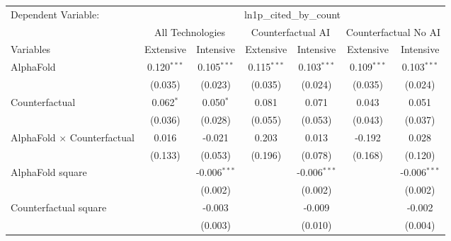 \begingroup
\centering
\begin{tabular}{lcccccc}
   \tabularnewline \midrule \midrule
   Dependent Variable: & \multicolumn{6}{c}{ln1p\_cited\_by\_count}\\
 & \multicolumn{2}{c}{All Technologies} & \multicolumn{2}{c}{Counterfactual AI} & \multicolumn{2}{c}{Counterfactual No AI} \\
\cmidrule(lr){1-1}\cmidrule(lr){2-3} \cmidrule(lr){4-5} \cmidrule(lr){6-7}
Variables & \multicolumn{1}{c}{Extensive} & \multicolumn{1}{c}{Intensive} & \multicolumn{1}{c}{Extensive} & \multicolumn{1}{c}{Intensive} & \multicolumn{1}{c}{Extensive} & \multicolumn{1}{c}{Intensive} \\
\cmidrule(lr){1-1}\cmidrule(lr){2-2} \cmidrule(lr){3-3} \cmidrule(lr){4-4} \cmidrule(lr){5-5} \cmidrule(lr){6-6} \cmidrule(lr){7-7}
   AlphaFold                          & 0.120$^{***}$ & 0.105$^{***}$  & 0.115$^{***}$ & 0.103$^{***}$  & 0.109$^{***}$ & 0.103$^{***}$\\   
                                      & (0.035)       & (0.023)        & (0.035)       & (0.024)        & (0.035)       & (0.024)\\   
   Counterfactual                     & 0.062$^{*}$   & 0.050$^{*}$    & 0.081         & 0.071          & 0.043         & 0.051\\   
                                      & (0.036)       & (0.028)        & (0.055)       & (0.053)        & (0.043)       & (0.037)\\   
   AlphaFold $\times$ Counterfactual  & 0.016         & -0.021         & 0.203         & 0.013          & -0.192        & 0.028\\   
                                      & (0.133)       & (0.053)        & (0.196)       & (0.078)        & (0.168)       & (0.120)\\   
   AlphaFold square                   &               & -0.006$^{***}$ &               & -0.006$^{***}$ &               & -0.006$^{***}$\\   
                                      &               & (0.002)        &               & (0.002)        &               & (0.002)\\   
   Counterfactual square              &               & -0.003         &               & -0.009         &               & -0.002\\   
                                      &               & (0.003)        &               & (0.010)        &               & (0.004)\\   

\end{tabular}
